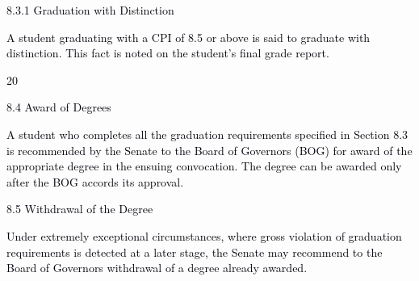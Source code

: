 \documentclass[12pt]{article}
\begin{document}
\vspace{\baselineskip}
\textcolor[HTML]{00000A}{8.3.1 Graduation with Distinction}\par


\vspace{\baselineskip}
\begin{adjustwidth}{0.0in}{0.21in}
{\fontsize{10pt}{12.0pt}\selectfont \textcolor[HTML]{00000A}{A student graduating with a CPI of 8.5 or above is said to graduate with distinction. This fact is noted on the student’s final grade report.}\par}\par

\end{adjustwidth}


\vspace{\baselineskip}

\vspace{\baselineskip}

\vspace{\baselineskip}

\vspace{\baselineskip}

\vspace{\baselineskip}

\vspace{\baselineskip}
\begin{Center}
\textcolor[HTML]{00000A}{20}
\end{Center}\par


\vspace{\baselineskip}
\textcolor[HTML]{00000A}{8.4 Award of Degrees}\par


\vspace{\baselineskip}
{\fontsize{10pt}{12.0pt}\selectfont \textcolor[HTML]{00000A}{A student who completes all the graduation requirements specified in Section 8.3 is recommended by the Senate to the Board of Governors (BOG) for award of the appropriate degree in the ensuing convocation. The degree can be awarded only after the BOG accords its approval.}\par}\par


\vspace{\baselineskip}
\textcolor[HTML]{00000A}{8.5 Withdrawal of the Degree}\par


\vspace{\baselineskip}
\begin{adjustwidth}{0.0in}{0.11in}
{\fontsize{10pt}{12.0pt}\selectfont \textcolor[HTML]{00000A}{Under extremely exceptional circumstances, where gross violation of graduation requirements is detected at a later stage, the Senate may recommend to the Board of Governors withdrawal of a degree already awarded.}\par}\par

\end{adjustwidth}
\end{document}
